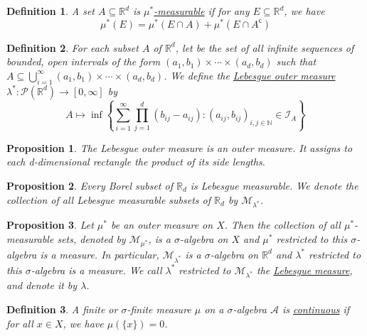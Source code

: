 \documentclass[12pt]{article}
\newtheorem{definition}{Definition}[subsection]
\newtheorem{proposition}{Proposition}[subsection]
\begin{document}
\begin{definition}
	A set $A \subseteq \mathbb{R}^d$ is \underline{$\mu^*$-measurable} if for any $E \subseteq \mathbb{R}^d$, we have
	\begin{equation*}
		\mu^*(E) = \mu^*(E \cap A) + \mu^*(E \cap A^\mathsf{c})
	\end{equation*}
\end{definition}

\begin{definition}
	For each subset $A$ of $\mathbb{R}^d$, let be the set of all infinite sequences of bounded, open intervals of the form $(a_1, b_1) \times \cdots \times (a_d, b_d)$ such that $A \subseteq \bigcup_{i=1}^\infty (a_1, b_1) \times \cdots \times (a_d, b_d)$. We
	define the \underline{Lebesgue outer measure} $\lambda^*:\mathcal{P}(\mathbb{R}^d) \to [0, \infty]$ by
	$$ A \mapsto \inf\left\{\sum_{i=1}^\infty \prod_{j=1}^d (b_{ij} - a_{ij}): (a_{ij}, b_{ij})_{i,j \in \mathbb{N}} \in \mathcal{I}_A\right\}$$
\end{definition}

\begin{proposition}
	The Lebesgue outer measure is an outer measure. It assigns to each d-dimensional rectangle the product of its side lengths.
\end{proposition}

\begin{proposition}
	Every Borel subset of $\mathbb{R}_d$ is Lebesgue measurable. We denote the collection of all Lebesgue measurable subsets of $\mathbb{R}_d$ by $\mathcal{M}_{\lambda^*}$.
\end{proposition}


\begin{proposition}
	Let $\mu^*$ be an outer measure on $X$. Then the collection of all $\mu^*$-measurable sets, denoted by $\mathcal{M}_{\mu^*}$, is a $\sigma$-algebra on $X$ and $\mu^*$ restricted to this $\sigma$-algebra is a measure.
	In particular, $\mathcal{M}_{\lambda^*}$ is a $\sigma$-algebra on $\mathbb{R}^d$ and $\lambda^*$ restricted to this $\sigma$-algebra is a measure. We call $\lambda^*$ restricted to $\mathcal{M}_{\lambda^*}$ the \underline{Lebesgue measure}, and denote it by $\lambda$.
\end{proposition}

\begin{definition}
	A finite or $\sigma$-finite measure $\mu$ on a $\sigma$-algebra $\mathcal{A}$ is \underline{continuous} if for all $x\in X$, we have $\mu(\{x\}) = 0$.
\end{definition}
\end{document}
